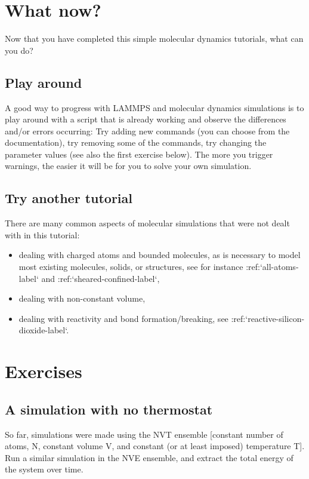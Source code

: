 \section{What now?}

\noindent Now that you have completed this simple molecular dynamics tutorials, what can you do?

\subsection{Play around}

\noindent A good way to progress with LAMMPS and molecular dynamics
simulations is to play around with a script that is already
working and observe the differences and/or errors occurring:
Try adding new commands (you can choose from the documentation),
try removing some of the commands, try changing the parameter values
(see also the first exercise below).
The more you trigger warnings, the easier it will be for you to solve your
own simulation.

\subsection{Try another tutorial}

\noindent There are many common aspects of molecular simulations that were not dealt with in this
tutorial:
\begin{itemize}
\item dealing with charged atoms and bounded molecules, as is necessary to model most existing molecules, solids, or structures, see for instance :ref:`all-atoms-label` and :ref:`sheared-confined-label`,
\item dealing with non-constant volume,
\item dealing with reactivity and bond formation/breaking, see :ref:`reactive-silicon-dioxide-label`.
\end{itemize}

\section{Exercises}

\noindent \subsection{A simulation with no thermostat}

So far, simulations were made using the NVT ensemble [constant number 
of atoms, N, constant volume V, and constant (or at least imposed)
temperature T].
Run a similar simulation in the NVE ensemble, and extract the
total energy of the system over time.

